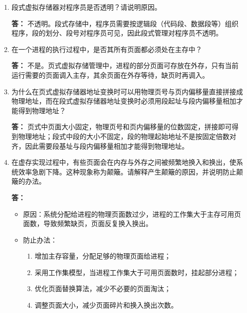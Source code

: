\documentclass{article}
\begin{document}
\begin{enumerate}[label=\arabic*.]
    \item 段式虚拟存储器对程序员是否透明？请说明原因。
    
    \textbf{答：}
    不透明。段式存储中，程序员需要按逻辑段（代码段、数据段等）组织程序，段的划分、段号对程序员可见，因此段式管理对程序员不透明。

    \item 在一个进程的执行过程中，是否其所有页面都必须处在主存中？
    
    \textbf{答：}
    不是。页式虚拟存储管理中，进程的部分页面可存放在外存，只有当前运行需要的页面调入主存，其余页面在外存等待，缺页时再调入。

    \item 为什么在页式虚拟存储器地址变换时可以用物理页号与页内偏移量直接拼接成物理地址，而在段式虚拟存储器地址变换时必须用段起址与段内偏移量相加才能得到物理地址？
    
    \textbf{答：}
    页式中页面大小固定，物理页号和页内偏移量的位数固定，拼接即可得到物理地址；段式中段的大小不固定，段的物理起始地址不是按固定倍数对齐，因此需要段基址与段内偏移量相加才能得到物理地址。

    \item 在虚存实现过程中，有些页面会在内存与外存之间被频繁地换入和换出，使系统效率急剧下降。这种现象称为颠簸。请解释产生颠簸的原因，并说明防止颠簸的办法。
    
    \textbf{答：}
    \begin{itemize}
        \item 原因：系统分配给进程的物理页面数过少，进程的工作集大于主存可用页面数，导致频繁缺页，页面反复换入换出。
        \item 防止办法：
        \begin{enumerate}
            \item 增加主存容量，分配足够的物理页面给进程；
            \item 采用工作集模型，当进程工作集大于可用页面数时，挂起部分进程；
            \item 优化页面替换算法，减少不必要的页面淘汰；
            \item 调整页面大小，减少页面碎片和换入换出次数。
        \end{enumerate}
    \end{itemize}
\end{enumerate}
\end{document}
